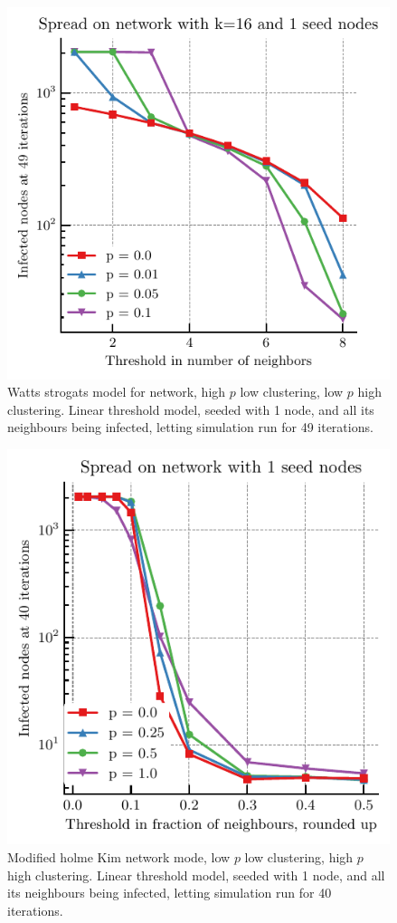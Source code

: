 \documentclass[fleqn,10pt]{wlscirep}
\begin{document}
\begin{figure}[hbtp]
  \includegraphics[width=0.997\textwidth]{fig/response_ws_2048_16_1.pdf}
\caption{Watts strogats model for network, high $p$ low clustering, low $p$ high clustering. Linear threshold model, seeded with 1 node, and all its neighbours being infected, letting simulation run for 49 iterations. }
\label{fig:wscmp}
\end{figure}

\begin{figure}[hbtp]
  \includegraphics[width=0.997\textwidth]{fig/2048_1_response.pdf}
\caption{Modified holme Kim network mode, low $p$ low clustering, high $p$ high clustering. Linear threshold model, seeded with 1 node, and all its neighbours being infected, letting simulation run for 40 iterations. }
\label{fig:wscmp}
\end{figure}
\end{document}
